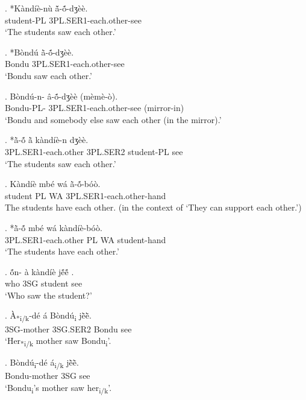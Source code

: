 \documentclass{assets/fieldnotes}
\begin{document}
\exg. *K\`{a}nd\'{i}\`{e}-n\`{u} ã̌-\textipa{\textltailn}ṍ-dʒ\`{e}\`{e}. \\
student-PL 3PL.SER1-each.other-see \\
`The students saw each other.' 

\exg. *B\`{o}nd\'{u} ã̀-\textipa{\textltailn}ṍ-dʒ\`{e}\`{e}. \\
Bondu 3PL.SER1-each.other-see \\
`Bondu saw each other.' 

\exg. B\`{o}nd\'{u}-n- \^{a}-\textipa{\textltailn}ṍ-dʒ\`{e}\`{e} (m\`{e}m\`{e}-\`{o}). \\
Bondu-PL- 3PL.SER1-each.other-see (mirror-in)\\
`Bondu and somebody else saw each other (in the mirror).' 


\exg. *ã̀-\textipa{\textltailn}ṍ  ã̀ k\`{a}nd\'{i}\`{e}-n dʒ\`{e}\`{e}. \\
3PL.SER1-each.other 3PL.SER2 student-PL see \\
`The students saw each other.' 

\exg. K\`{a}nd\'{i}\`{e} mb\'{e} w\'{a} ã̀-\textipa{\textltailn}ṍ-b\'{o}\`{o}. \\
student PL WA 3PL.SER1-each.other-hand \\
The students have each other. (in the context of `They can support each other.')

\exg. *ã̀-\textipa{\textltailn}ṍ mb\'{e} w\'{a} k\`{a}nd\'{i}\`{e}-b\'{o}\`{o}. \\
3PL.SER1-each.other PL WA student-hand \\
`The students have each other.'

\exg. \textipa{\textltailn}ṍn- \`{a} k\`{a}nd\'{i}\`{e} jẽ́ẽ́ . \\
who 3SG student see \\
`Who saw the student?'


\exg. \`{A}\textsubscript{*i/k}-d\'{e} \'{a} B\`{o}nd\'{u}\textsubscript{i} jẽ̀ẽ̀. \\
3SG-mother 3SG.SER2 Bondu see \\
`Her\textsubscript{*i/k} mother saw Bondu\textsubscript{i}'. 

\exg. B\`{o}nd\'{u}\textsubscript{i}-d\'{e} \'{a}\textsubscript{i/k} jẽ̀ẽ̀. \\
Bondu-mother 3SG see \\
`Bondu\textsubscript{i}'s mother saw her\textsubscript{i/k}'.
\end{document}
